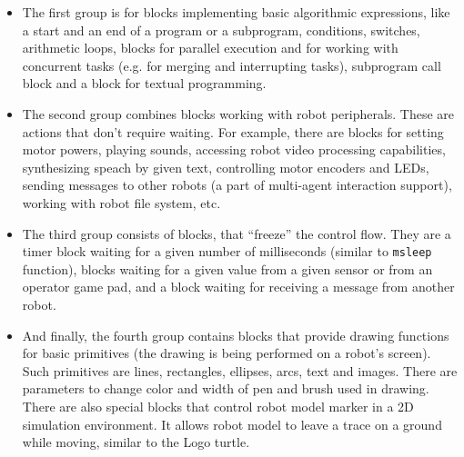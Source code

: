 \documentclass[conference]{IEEEtran}
\begin{document}
\begin{itemize}
    \item The first group is for blocks implementing basic algorithmic expressions, like a start and an end of a program or a subprogram, conditions, switches, arithmetic loops, blocks for parallel execution and for working with concurrent tasks (e.g. for merging and interrupting tasks), subprogram call block and a block for textual programming.
    \item The second group combines blocks working with robot peripherals. These are actions that don't require waiting. For example, there are blocks for setting motor powers, playing sounds, accessing robot video processing capabilities, synthesizing speach by given text, controlling motor encoders and LEDs, sending messages to other robots (a part of multi-agent interaction support), working with robot file system, etc.
    \item The third group consists of blocks, that ``freeze'' the control flow. They are a timer block waiting for a given number of milliseconds (similar to \texttt{msleep} function), blocks waiting for a given value from a given sensor or from an operator game pad, and a block waiting for receiving a message from another robot. 
    \item And finally, the fourth group contains blocks that provide drawing functions for basic primitives (the drawing is being performed on a robot's screen). Such primitives are lines, rectangles, ellipses, arcs, text and images. There are parameters to change color and width of pen and brush used in drawing. There are also special blocks that control robot model marker in a 2D simulation environment. It allows robot model to leave a trace on a ground while moving, similar to the Logo turtle.
\end{itemize}
\end{document}
